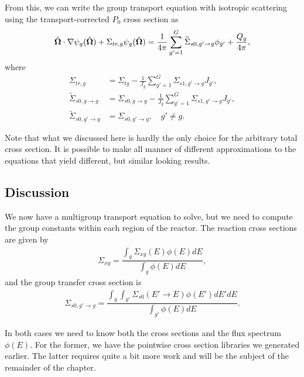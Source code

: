 From this, we can write the group transport equation with isotropic scattering using the transport-corrected $P_0$ cross section as
\begin{align}
  \hat{\mathbf{\Omega}} \cdot \nabla \psi_g(\hat{\mathbf{\Omega}}) + \Sigma_{tr,g} \psi_g(\hat{\mathbf{\Omega}}) = \frac{1}{4\pi} \sum_{g' = 1}^G \widetilde{\Sigma}_{s0,g' \rightarrow g} \phi_{g'} + \frac{Q_g}{4\pi},
\end{align}
where
\begin{subequations}
\begin{align}
  \Sigma_{tr,g} &=  \Sigma_{tg} - \frac{1}{J_g} \sum_{g'=1}^G \Sigma_{s1,g' \rightarrow g} J_{g'} , \\
  \widetilde{\Sigma}_{s0,g \rightarrow g} &= \Sigma_{s0,g \rightarrow g} - \frac{1}{J_g} \sum_{g'=1}^G \Sigma_{s1,g' \rightarrow g} J_{g'}, \\
  \widetilde{\Sigma}_{s0,g' \rightarrow g} &= \Sigma_{s0,g' \rightarrow g} , \quad g' \ne g.  
\end{align}
\end{subequations}


Note that what we discussed here is hardly the only choice for the arbitrary total cross section. It is possible to make all manner of different approximations to the equations that yield different, but similar looking results.

\subsection{Discussion}

We now have a multigroup transport equation to solve, but we need to compute the group constants within each region of the reactor. The reaction cross sections are given by
\begin{align}
  \Sigma_{xg} = \dfrac{ \displaystyle\int_g \Sigma_{xg}(E) \phi(E) dE }{ \displaystyle\int_g \phi(E) dE } ,
\end{align}
and the group transfer cross section is
\begin{align}
  \Sigma_{s0,g' \rightarrow g} = \dfrac{ \displaystyle\int_g \int_{g'} \Sigma_{s0}(E' \rightarrow E) \phi(E') dE' dE }{ \displaystyle\int_{g'} \phi(E) dE } .
\end{align}

In both cases we need to know both the cross sections and the flux spectrum $\phi(E)$. For the former, we have the pointwise cross section libraries we generated earlier. The latter requires quite a bit more work and will be the subject of the remainder of the chapter.






